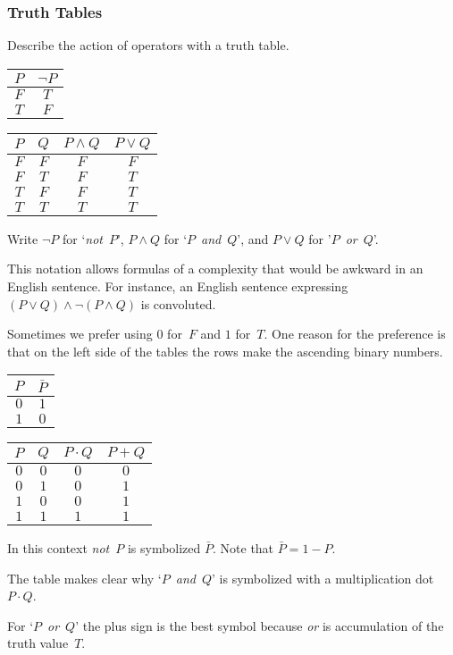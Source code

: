 \documentclass[10pt,t]{beamer}
\begin{document}
\begin{frame}
  \frametitle{Truth Tables}

Describe the action of operators with a \alert{truth table}. 
\begin{center}
  \begin{tabular}[t]{c|c}
    $P$  &$\neg P$  \\ \hline
    $F$  &$T$  \\
    $T$  &$F$
  \end{tabular}
  \qquad
  \begin{tabular}[t]{cc|cc}
    $P$  &$Q$  &$P\wedge Q$  &$P\vee Q$  \\ \hline
    $F$  &$F$  &$F$          &$F$  \\
    $F$  &$T$  &$F$          &$T$  \\
    $T$  &$F$  &$F$          &$T$  \\
    $T$  &$T$  &$T$          &$T$  
  \end{tabular}
\end{center}
Write $\neg P$ for `\textit{not}~$P$', 
$P\wedge Q$ for `$P$~\textit{and}~$Q$',
and $P\vee Q$ for '$P$~\textit{or}~$Q$'.  

\pause
This notation allows formulas of a complexity that would be awkward in
an English sentence. 
For instance, an English sentence expressing 
$(P\vee Q)\wedge \neg(P\wedge Q)$ is convoluted.
\end{frame}




\begin{frame}
Sometimes we prefer using $0$ for~$F$ and $1$ for~$T$.
One reason for the preference is that on 
the left side of the tables the rows make the ascending binary numbers.
\begin{center}
  \begin{tabular}[t]{c|c}
    $P$  &$\bar{P}$  \\ \hline
    $0$  &$1$  \\
    $1$  &$0$
  \end{tabular}
  \qquad
  \begin{tabular}[t]{cc|cc}
    $P$  &$Q$  &$P\cdot Q$  &$P+ Q$  \\ \hline
    $0$  &$0$  &$0$          &$0$  \\
    $0$  &$1$  &$0$          &$1$  \\
    $1$  &$0$  &$0$          &$1$  \\
    $1$  &$1$  &$1$          &$1$  
  \end{tabular}
\end{center}
\pause
In this context \textit{not}~$P$ is symbolized $\bar{P}$.
Note that $\bar{P}=1-P$.

The table makes clear why `$P$~\textit{and}~$Q$' is symbolized with a 
multiplication dot~$P\cdot Q$.

For `$P$~\textit{or}~$Q$' the plus sign is the best symbol because 
\textit{or} is accumulation of the truth value~$T$.
\end{frame}
\end{document}
